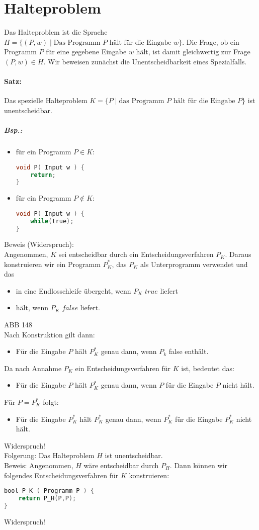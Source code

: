 \section{Halteproblem}
Das Halteproblem ist die Sprache $H=\{ (P,w) \;|\; \text{Das Programm $P$ hält für die Eingabe }w\}$. Die Frage, ob ein Programm $P$ für eine gegebene Eingabe $w$ hält, ist damit gleichwertig zur Frage $(P,w)\in H$. Wir beweisen zunächst die Unentscheidbarkeit eines Spezialfalls.
\paragraph{Satz:} Das spezielle Halteproblem $K=\{P\;|\;\text{das Programm $P$ hält für die Eingabe }P\}$ ist unentscheidbar.
\subparagraph{Bsp.:}
\begin{itemize}
\item für ein Programm $P \in K$:\begin{lstlisting}[language=C]
void P( Input w ) {
	return;
}
\end{lstlisting}
\item für ein Programm $P \not \in K$:
\begin{lstlisting}[language=C]
void P( Input w ) {
	while(true);
}
\end{lstlisting}
\end{itemize}
Beweis (Widerspruch):\\
Angenommen, $K$ sei entscheidbar durch ein Entscheidungsverfahren $P_K$. Daraus konstruieren wir ein Programm $P_K^*$, das $P_K$ als Unterprogramm verwendet und das
\begin{itemize}
\item in eine Endlosschleife übergeht, wenn $P_K$ $true$ liefert
\item hält, wenn $P_K$ $false$ liefert.
\end{itemize}
ABB 148\\
Nach Konstruktion gilt dann:
\begin{itemize}
\item Für die Eingabe $P$ hält $P_K^*$ genau dann, wenn $P_k$ false enthält.
\end{itemize}
Da nach Annahme $P_K$ ein Entscheidungsverfahren für $K$ ist, bedeutet das:
\begin{itemize}
\item Für die Eingabe $P$ hält $P_K^*$ genau dann, wenn $P$ für die Eingabe $P$ nicht hält.
\end{itemize}
Für $P=P_K^*$ folgt:
\begin{itemize}
\item Für die Eingabe $P_K^*$ hält $P_K^*$ genau dann, wenn $P_K^*$ für die Eingabe $P_K^*$ nicht hält.
\end{itemize}
Widerspruch!\medskip\\
Folgerung: Das Halteproblem $H$ ist unentscheidbar.\\
Beweis: Angenommen, $H$ wäre entscheidbar durch $P_H$. Dann können wir folgendes Entscheidungsverfahren für $K$ konstruieren:
\begin{lstlisting}[language=C]
bool P_K ( Programm P ) {
	return P_H(P,P);
}
\end{lstlisting}
Widerspruch!

